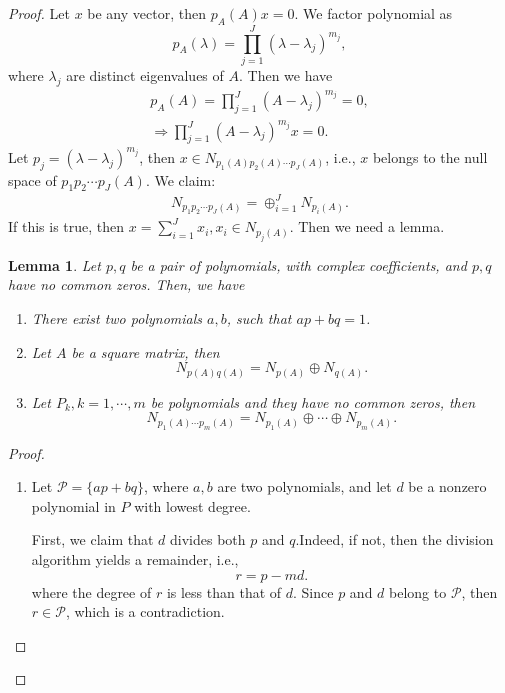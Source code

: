 \documentclass[10pt]{book}
\newtheorem{lemma}[theorem]{Lemma}
\theoremstyle{definition}
\numberwithin{equation}{chapter}
\begin{document}
\begin{proof}
Let $x$ be any vector, then $p_A(A)x = 0$. We factor polynomial as $$p_A(\lambda) = \prod^J_{j=1}\left(\lambda - \lambda_j\right)^{m_j},$$ where $\lambda_j$ are distinct eigenvalues of $A$. Then we have
\begin{align*}
    p_A(A) = \prod^J_{j=1}\left(A - \lambda_j\right)^{m_j} = 0, \\
    \Rightarrow \prod^J_{j=1}\left(A - \lambda_j\right)^{m_j}x = 0.
\end{align*}
Let $p_j = \left(\lambda - \lambda_j\right)^{m_j}$, then $x\in N_{p_1(A)p_2(A)\cdots p_J(A)}$, i.e., $x$ belongs to the null space of $p_1 p_2 \cdots p_J(A)$. We claim: 
\begin{align*}
    N_{p_1p_2\cdots p_J(A)} = \oplus^J_{i=1} N_{p_i(A)}.
\end{align*}
If this is true, then $x = \sum^J_{i=1}x_i, x_i\in N_{p_j(A)}$. Then we need a lemma.

\begin{lemma}
Let $p, q$ be a pair of polynomials, with complex coefficients, and $p,q$ have no common zeros. Then, we have
\begin{enumerate}[label=(\alph*)]
    \item There exist two polynomials $a,b$, such that $ap+bq = 1$.
    \item Let $A$ be a square matrix, then 
    $$N_{p(A)q(A)} = N_{p(A)} \oplus N_{q(A)}.$$
    \item Let $P_k, k = 1, \cdots, m$ be polynomials and they have no common zeros, then 
    $$N_{p_1(A)\cdots p_m(A)} = N_{p_1(A)} \oplus\cdots\oplus N_{p_m(A)}.$$
\end{enumerate}
\end{lemma}
\begin{proof}
~\begin{enumerate}[label=(\alph*)]
    \item Let $\mathcal{P} = \{ap+bq\}$, where $a,b$ are two polynomials, and let $d$ be a nonzero polynomial in $P$ with lowest degree. 
    
    First, we claim that $d$ divides both $p$ and $q$.Indeed, if not, then the division algorithm yields a remainder, i.e.,
    $$r = p - md.$$
    where the degree of $r$ is less than that of $d$. Since $p$ and $d$ belong to $\mathcal{P}$, then $r\in \mathcal{P}$, which is a contradiction. 
    

\end{enumerate}
\end{proof}
\end{proof}
\end{document}
